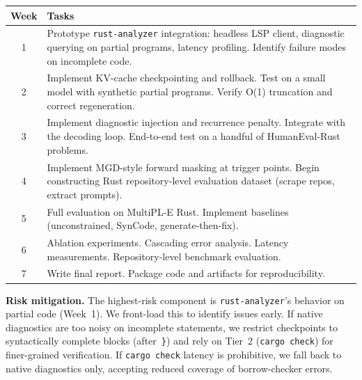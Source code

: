\documentclass[11pt,letterpaper]{article}
\begin{document}
\begin{table}[h]
\centering
\small
\begin{tabular}{@{}cp{5.0in}@{}}
\toprule
\textbf{Week} & \textbf{Tasks} \\
\midrule
1 & Prototype \texttt{rust-analyzer} integration: headless LSP client, diagnostic querying on partial programs, latency profiling. Identify failure modes on incomplete code. \\
2 & Implement KV-cache checkpointing and rollback. Test on a small model with synthetic partial programs. Verify O(1) truncation and correct regeneration. \\
3 & Implement diagnostic injection and recurrence penalty. Integrate with the decoding loop. End-to-end test on a handful of HumanEval-Rust problems. \\
4 & Implement MGD-style forward masking at trigger points. Begin constructing Rust repository-level evaluation dataset (scrape repos, extract prompts). \\
5 & Full evaluation on MultiPL-E Rust. Implement baselines (unconstrained, SynCode, generate-then-fix). \\
6 & Ablation experiments. Cascading error analysis. Latency measurements. Repository-level benchmark evaluation. \\
7 & Write final report. Package code and artifacts for reproducibility. \\
\bottomrule
\end{tabular}
\end{table}

\textbf{Risk mitigation.}
The highest-risk component is \texttt{rust-analyzer}'s behavior on partial code (Week~1). We front-load this to identify issues early. If native diagnostics are too noisy on incomplete statements, we restrict checkpoints to syntactically complete blocks (after~\texttt{\}}) and rely on Tier~2 (\texttt{cargo check}) for finer-grained verification. If \texttt{cargo check} latency is prohibitive, we fall back to native diagnostics only, accepting reduced coverage of borrow-checker errors.



\end{document}
